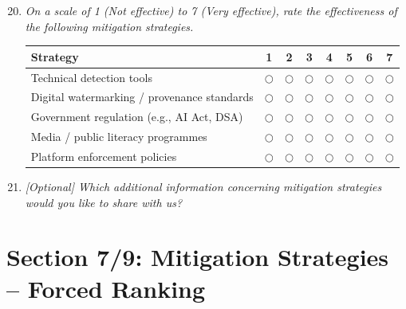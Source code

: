 \begin{enumerate}[label=\textbf{Q\arabic*.}, leftmargin=3em]
\setcounter{enumi}{19}

    \item \textit{On a scale of 1 (Not effective) to 7 (Very effective), rate the effectiveness of the following mitigation strategies.}

    \medskip
    \noindent\begin{tabular}{l ccccccc}
    \toprule
    \textbf{Strategy} & \textbf{1} & \textbf{2} & \textbf{3} & \textbf{4} & \textbf{5} & \textbf{6} & \textbf{7} \\
    \midrule
    Technical detection tools                    & $\bigcirc$ & $\bigcirc$ & $\bigcirc$ & $\bigcirc$ & $\bigcirc$ & $\bigcirc$ & $\bigcirc$ \\
    Digital watermarking / provenance standards  & $\bigcirc$ & $\bigcirc$ & $\bigcirc$ & $\bigcirc$ & $\bigcirc$ & $\bigcirc$ & $\bigcirc$ \\
    Government regulation (e.g., AI Act, DSA)    & $\bigcirc$ & $\bigcirc$ & $\bigcirc$ & $\bigcirc$ & $\bigcirc$ & $\bigcirc$ & $\bigcirc$ \\
    Media / public literacy programmes           & $\bigcirc$ & $\bigcirc$ & $\bigcirc$ & $\bigcirc$ & $\bigcirc$ & $\bigcirc$ & $\bigcirc$ \\
    Platform enforcement policies                & $\bigcirc$ & $\bigcirc$ & $\bigcirc$ & $\bigcirc$ & $\bigcirc$ & $\bigcirc$ & $\bigcirc$ \\
    \bottomrule
    \end{tabular}

    \item \textit{[Optional] Which additional information concerning mitigation strategies would you like to share with us?}\\[2pt]
    \framebox[\linewidth]{\rule{0pt}{2em}}

\end{enumerate}

\section*{Section 7/9: Mitigation Strategies -- Forced Ranking}

